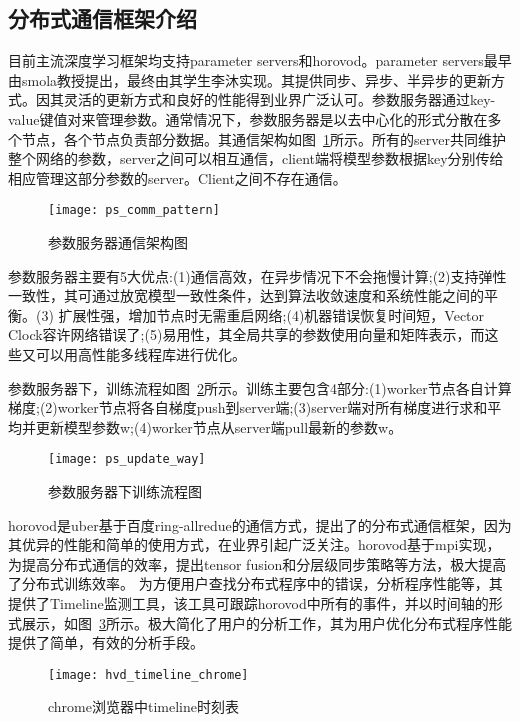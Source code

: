 \subsection{分布式通信框架介绍}
目前主流深度学习框架均支持parameter servers和horovod。parameter servers最早由smola教授提出，最终由其学生李沐实现。其提供同步、异步、半异步的更新方式。因其灵活的更新方式和良好的性能得到业界广泛认可。参数服务器通过key-value键值对来管理参数。通常情况下，参数服务器是以去中心化的形式分散在多个节点，各个节点负责部分数据。其通信架构如图~\ref{fig:ps_comm_pattern}所示。所有的server共同维护整个网络的参数，server之间可以相互通信，client端将模型参数根据key分别传给相应管理这部分参数的server。Client之间不存在通信。

\begin{figure}[htp]
\centering
\texttt{[image: ps\_comm\_pattern]}
\caption{参数服务器通信架构图}
\label{fig:ps_comm_pattern}
\end{figure}
参数服务器主要有5大优点:(1)通信高效，在异步情况下不会拖慢计算;(2)支持弹性一致性，其可通过放宽模型一致性条件，达到算法收敛速度和系统性能之间的平衡。(3) 扩展性强，增加节点时无需重启网络;(4)机器错误恢复时间短，Vector Clock容许网络错误了;(5)易用性，其全局共享的参数使用向量和矩阵表示，而这些又可以用高性能多线程库进行优化。

参数服务器下，训练流程如图~\ref{fig:ps_update_way}所示。训练主要包含4部分:(1)worker节点各自计算梯度;(2)worker节点将各自梯度push到server端;(3)server端对所有梯度进行求和平均并更新模型参数w;(4)worker节点从server端pull最新的参数w。

\begin{figure}[htp]
\centering
\texttt{[image: ps\_update\_way]}
\caption{参数服务器下训练流程图}
\label{fig:ps_update_way}
\end{figure}
horovod是uber基于百度ring-allredue的通信方式，提出了的分布式通信框架，因为其优异的性能和简单的使用方式，在业界引起广泛关注。horovod基于mpi实现，为提高分布式通信的效率，提出tensor fusion和分层级同步策略等方法，极大提高了分布式训练效率。 为方便用户查找分布式程序中的错误，分析程序性能等，其提供了Timeline监测工具，该工具可跟踪horovod中所有的事件，并以时间轴的形式展示，如图~\ref{fig:hvd_timeline_chrome}所示。极大简化了用户的分析工作，其为用户优化分布式程序性能提供了简单，有效的分析手段。
\begin{figure}[htp]
\centering
\texttt{[image: hvd\_timeline\_chrome]}
\caption{chrome浏览器中timeline时刻表}
\label{fig:hvd_timeline_chrome}
\end{figure}

